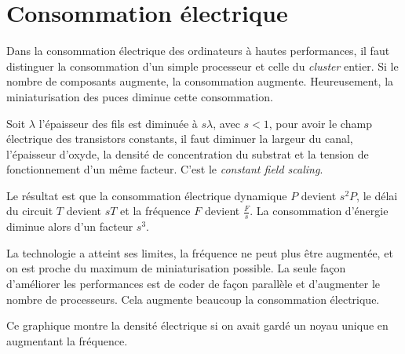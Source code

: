 \section{Consommation électrique}

Dans la consommation électrique des ordinateurs à hautes performances, il faut distinguer la consommation d'un simple processeur et celle du \textit{cluster} entier. Si le nombre de composants augmente, la consommation augmente. Heureusement, la miniaturisation des puces diminue cette consommation. 

Soit $\lambda$ l'épaisseur des fils est diminuée à $s\lambda$, avec $s < 1$, pour avoir le champ électrique des transistors constants,  il faut diminuer la largeur du canal, l'épaisseur d'oxyde, la densité de concentration du substrat et la tension de fonctionnement d'un même facteur. C'est le \textit{constant field scaling}.

Le résultat est que la consommation électrique dynamique $P$ devient $s^2 P$, le délai du circuit $T$ devient $sT$ et la fréquence $F$ devient $\frac{F}{s}$.  La consommation d'énergie diminue alors d'un facteur $s^3$.

La technologie a atteint ses limites, la fréquence ne peut plus être augmentée, et on est proche du maximum de miniaturisation possible. La seule façon d'améliorer les performances est de coder de façon parallèle et d'augmenter le nombre de processeurs. Cela augmente beaucoup la consommation électrique.

Ce graphique montre la densité électrique si on avait gardé un noyau unique en augmentant la fréquence.



